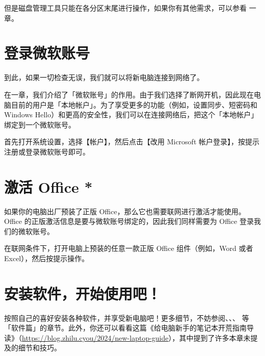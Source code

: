 但是磁盘管理工具只能在各分区末尾进行操作，如果你有其他需求，可以参看  一章。

\section{登录微软账号}

到此，如果一切检查无误，我们就可以将新电脑连接到网络了。

在一章，我们介绍了「微软账号」的作用。由于我们选择了断网开机，因此现在电脑目前的用户是「本地帐户」。为了享受更多的功能（例如，设置同步、短密码和 Windows Hello）和更高的安全性，我们可以在连接网络后，把这个「本地帐户」绑定到一个微软账号。

首先打开系统设置，选择【帐户】，然后点击【改用 Microsoft 帐户登录】，按提示注册或登录微软账号即可。

\section{激活 Office *}

如果你的电脑出厂预装了正版 Office，那么它也需要联网进行激活才能使用。Office 的正版激活信息是要与微软账号绑定的，因此我们同样需要为 Office 登录我们的微软账号。

在联网条件下，打开电脑上预装的任意一款正版 Office 组件（例如，Word 或者 Excel），然后按提示操作。

\section{安装软件，开始使用吧！}

按照自己的喜好安装各种软件，并享受新电脑吧！更多细节，不妨参阅、、、 等「软件篇」的章节。此外，你还可以看看这篇《给电脑新手的笔记本开荒指南导读》（\url{https://blog.zhilu.cyou/2024/new-laptop-guide}），其中提到了许多本章未提及的细节和技巧。
